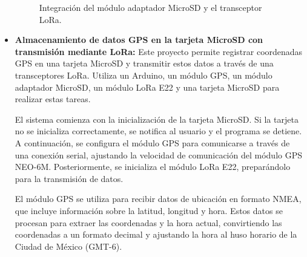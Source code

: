 \begin{itemize}
\begin{figure}[H]
    \centering
    \quad
    \caption{Integración del módulo adaptador MicroSD y el transceptor LoRa.}
    \label{fig:lora-memoria-img}
\end{figure}

\item \textbf{Almacenamiento de datos GPS en la tarjeta MicroSD con transmisión mediante LoRa:} 
Este proyecto permite registrar coordenadas GPS en una tarjeta MicroSD y transmitir estos datos a través de una transceptores LoRa. Utiliza un Arduino, un módulo GPS, un módulo adaptador MicroSD, un módulo LoRa E22 y una tarjeta MicroSD para realizar estas tareas.

El sistema comienza con la inicialización de la tarjeta MicroSD. Si la tarjeta no se inicializa correctamente, se notifica al usuario y el programa se detiene. A continuación, se configura el módulo GPS para comunicarse a través de una conexión serial, ajustando la velocidad de comunicación del módulo GPS NEO-6M. Posteriormente, se inicializa el módulo LoRa E22, preparándolo para la transmisión de datos.

El módulo GPS se utiliza para recibir datos de ubicación en formato NMEA, que incluye información sobre la latitud, longitud y hora. Estos datos se procesan para extraer las coordenadas y la hora actual, convirtiendo las coordenadas a un formato decimal y ajustando la hora al huso horario de la Ciudad de México (GMT-6).


\end{itemize}
